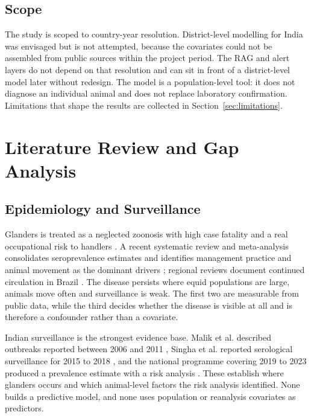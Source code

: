\documentclass[10pt,openany]{report}
\begin{document}
\section{Scope}

The study is scoped to country-year resolution. District-level modelling for India was envisaged but
is not attempted, because the covariates could not be assembled from public sources within the project
period. The RAG and alert layers do not depend on that resolution and can sit in front of a
district-level model later without redesign. The model is a population-level tool: it does not
diagnose an individual animal and does not replace laboratory confirmation. Limitations that shape
the results are collected in Section~\ref{sec:limitations}.

\chapter{Literature Review and Gap Analysis}
\label{ch:lit}

\section{Epidemiology and Surveillance}

Glanders is treated as a neglected zoonosis with high case fatality and a real occupational risk to
handlers \cite{khan2013,kanani2026}. A recent systematic review and meta-analysis consolidates
seroprevalence estimates and identifies management practice and animal movement as the dominant
drivers \cite{purnama2026}; regional reviews document continued circulation in Brazil
\cite{mota2022}. The disease persists where equid populations are large, animals move often and
surveillance is weak. The first two are measurable from public data, while the third decides whether
the disease is visible at all and is therefore a confounder rather than a covariate.

Indian surveillance is the strongest evidence base. Malik et al. described outbreaks reported
between 2006 and 2011 \cite{malik2012}, Singha et al. reported serological surveillance for 2015 to
2018 \cite{singha2020}, and the national programme covering 2019 to 2023 produced a prevalence
estimate with a risk analysis \cite{singha2026}. These establish where glanders occurs and which
animal-level factors the risk analysis identified. None builds a predictive model, and none uses
population or reanalysis covariates as predictors.
\end{document}
